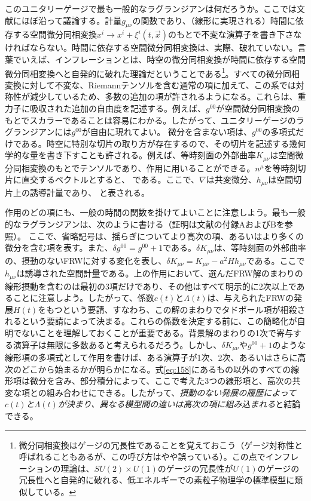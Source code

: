 このユニタリーゲージで最も一般的なラグランジアンは何だろうか。ここでは文献\cite{Cheung:2007st}にほぼ沿って議論する。計量$g_{\mu\nu}$の関数であり、（線形に実現される）時間に依存する空間微分同相変換$x^i\to x^i+\xi^i(t,\vec{x})$のもとで不変な演算子を書き下さなければならない。時間に依存する空間微分同相変換は、実際、破れていない。言葉でいえば、インフレーションとは、時空の微分同相変換が時間に依存する空間微分同相変換へと自発的に破れた理論だということである\footnote[9]{微分同相変換はゲージの冗長性であることを覚えておこう（ゲージ対称性と呼ばれることもあるが、この呼び方はやや誤っている）。この点でインフレーションの理論は、$SU(2)\times U(1)$のゲージの冗長性が$U(1)$のゲージの冗長性へと自発的に破れる、低エネルギーでの素粒子物理学の標準模型に類似している。}。すべての微分同相変換に対して不変な、Riemannテンソルを含む通常の項に加えて、この系では対称性が減少しているため、多数の追加の項が許されるようになる。これらは、重力子に吸収された追加の自由度を記述する。例えば、$g^{00}$が空間微分同相変換のもとでスカラーであることは容易にわかる。したがって、ユニタリーゲージのラグランジアンには$g^{00}$が自由に現れてよい。
微分を含まない項は、$g^{00}$の多項式だけである。時空に特別な切片の取り方が存在するので、その切片を記述する幾何学的な量を書き下すことも許される。例えば、等時刻面の外部曲率$K_{\mu\nu}$は空間微分同相変換のもとでテンソルであり、作用に用いることができる。$n^\mu$を等時刻切片に直交するベクトルとすると、
である。ここで、$\nabla$は共変微分、$h_{\mu\nu}$は空間切片上の誘導計量であり、
と表される。

作用のどの項にも、一般の時間の関数を掛けてよいことに注意しよう。最も一般的なラグランジアンは、次のように書ける（証明は文献\cite{Cheung:2007st}の付録AおよびBを参照）。
ここで、省略記号は、揺らぎについてより高次の項、あるいはより多くの微分を含む項を表す。また、$\delta g^{00}=g^{00}+1$である。$\delta K_{\mu\nu}$は、等時刻面の外部曲率の、摂動のないFRWに対する変化を表し、$\delta K_{\mu\nu}=K_{\mu\nu}-a^2Hh_{\mu\nu}$である。ここで$h_{\mu\nu}$は誘導された空間計量である。上の作用において、選んだFRW解のまわりの線形摂動を含むのは最初の3項だけであり、その他はすべて明示的に2次以上であることに注意しよう。したがって、係数$c(t)$と$\Lambda(t)$は、与えられたFRWの発展$H(t)$をもつという要請、すなわち、この解のまわりでタドポール項が相殺されるという要請によって決まる。これらの係数を決定する前に、この簡略化が自明でないことを理解しておくことが重要である。背景解のまわりの1次で寄与する演算子は無限に多数あると考えられるだろう。しかし、$\delta K_{\mu\nu}$や$g^{00}+1$のような線形項の多項式として作用を書けば、ある演算子が1次、2次、あるいはさらに高次のどこから始まるかが明らかになる。式\eqref{eq:158}にあるもの以外のすべての線形項は微分を含み、部分積分によって、ここで考えた3つの線形項と、高次の共変な項との組み合わせにできる。したがって、\emph{摂動のない発展の履歴によって$c(t)$と$\Lambda(t)$が決まり、異なる模型間の違いは高次の項に組み込まれる}と結論できる。

